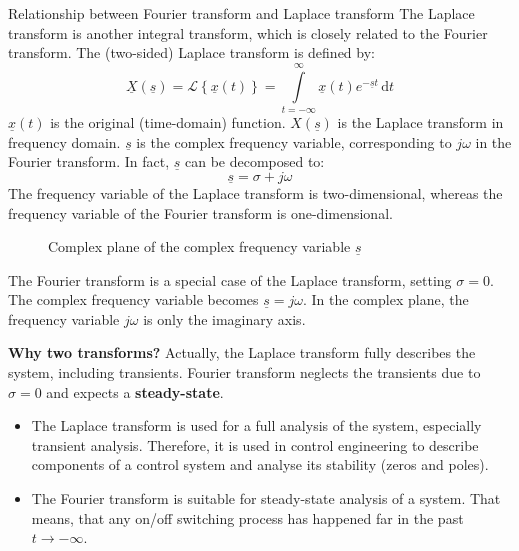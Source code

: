 \begin{refsection}
\begin{excursus}{Relationship between Fourier transform and Laplace transform}
	The  Laplace transform is another integral transform, which is closely related to the Fourier transform. The (two-sided) Laplace transform is defined by:
	\begin{equation}
		\underline{X}(\underline{s}) = \mathcal{L} \left\{\underline{x}(t)\right\} = \int\limits_{t = -\infty}^{\infty} \underline{x}(t) e^{- \underline{s} t} \, \mathrm{d} t
	\end{equation}
	$\underline{x}(t)$ is the original (time-domain) function. $X(\underline{s})$ is the Laplace transform in frequency domain. $\underline{s}$ is the complex frequency variable, corresponding to $j \omega$ in the Fourier transform. In fact, $\underline{s}$ can be decomposed to:
	\begin{equation}
		\underline{s} = \sigma + j \omega
	\end{equation}
	The frequency variable of the Laplace transform is two-dimensional, whereas the frequency variable of the Fourier transform is one-dimensional.
	
	\begin{figure}[H]
		\centering
		\caption{Complex plane of the complex frequency variable $\underline{s}$}
	\end{figure}
	
	The Fourier transform is a special case of the Laplace transform, setting $\sigma = 0$. The complex frequency variable becomes $\underline{s} = j \omega$. In the complex plane, the frequency variable $j \omega$ is only the imaginary axis.
	
	\vspace{0.5em}
	
	\textbf{Why two transforms?} Actually, the Laplace transform fully describes the system, including transients. Fourier transform neglects the transients due to $\sigma = 0$ and expects a \textbf{steady-state}.
	\begin{itemize}
		\item The Laplace transform is used for a full analysis of the system, especially transient analysis. Therefore, it is used in control engineering to describe components of a control system and analyse its stability (zeros and poles).
		\item The Fourier transform is suitable for steady-state analysis of a system. That means, that any on/off switching process has happened far in the past $t \rightarrow -\infty$.
	\end{itemize}
	

\end{excursus}
\end{refsection}
